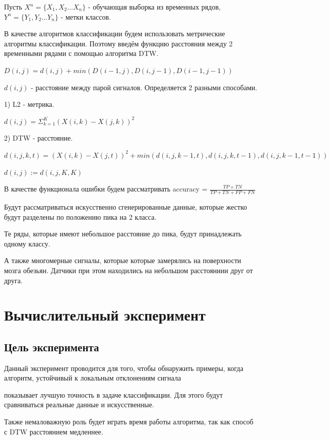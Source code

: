 \documentclass[12pt, twoside]{article}
\begin{document}
Пусть $X^n = \{X_1, X_2 \dots X_n\}$ - обучающая выборка из временных рядов, $Y^n = \{Y_1, Y_2 \dots Y_n\}$ - метки классов.

В качестве алгоритмов классификации будем использовать метрические алгоритмы классификации. Поэтому введём функцию расстояния между 2 временными рядами с помощью алгоритма DTW.

$D(i, j) = d(i, j) + min(D(i - 1, j), D(i, j - 1), D(i - 1, j - 1))$

$d(i, j)$ - расстояние между парой сигналов. Определяется 2 разными способами.

1) L2 - метрика.

$d(i, j) = \Sigma_{k = 1}^K(X(i, k) - X(j, k))^2$

2) DTW - расстояние.

$d(i, j, k, t) = (X(i, k) - X(j, t)) ^ 2 + min(d(i, j, k - 1, t), d(i, j, k, t - 1), d(i, j, k - 1, t - 1))$

$d(i, j) := d(i, j, K, K)$

В качестве функционала ошибки будем рассматривать accuracy = $\frac{TP + TN}{TP + TN + FP + FN}$

Будут рассматриваться искусственно сгенерированные данные, которые жестко будут разделены по положению пика на 2 класса.

Те ряды, которые имеют небольшое расстояние до пика, будут принадлежать одному классу.

А также многомерные сигналы, которые которые замерялись на поверхности мозга обезьян. Датчики при этом находились на небольшом расстояниии друг от друга. 


\section{Вычислительный эксперимент}

\subsection{Цель эксперимента}

Данный эксперимент проводится для того, чтобы обнаружить примеры, когда алгоритм, устойчивый к локальным отклонениям сигнала

показывает лучшую точность в задаче классификации. Для этого будут сравниваться реальные данные и искусственные.

Также немаловажную роль будет играть время работы алгоритма, так как способ с DTW расстоянием медленнее.
\end{document}
